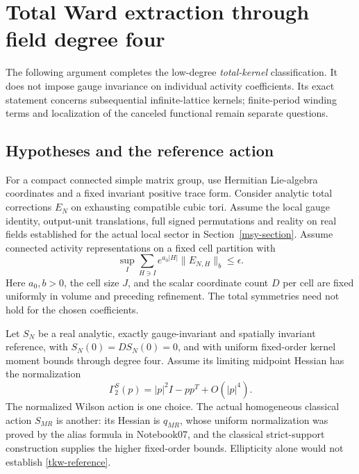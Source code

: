 \section{Total Ward extraction through field degree four}
\label{tkw-section}

The following argument completes the low-degree \emph{total-kernel}
classification. It does not impose gauge invariance on individual
activity coefficients. Its exact statement concerns subsequential
infinite-lattice kernels; finite-period winding terms and localization
of the canceled functional remain separate questions.

\subsection{Hypotheses and the reference action}
\label{tkw-hypotheses}

For a compact connected simple matrix group, use Hermitian Lie-algebra
coordinates and a fixed invariant positive trace form. Consider analytic
total corrections \(E_N\) on exhausting compatible cubic tori. Assume
the local gauge identity, output-unit translations, full signed
permutations and reality on real fields established for the actual
local sector in Section~\ref{msy-section}. Assume connected activity
representations on a fixed cell partition with
\begin{equation}
 \sup_I\sum_{H\ni I}e^{a_0|H|}\|E_{N,H}\|_b\le\epsilon .
 \label{tkw-activity}
\end{equation}
Here \(a_0,b>0\), the cell size \(J\), and the scalar coordinate count
\(D\) per cell are fixed uniformly in volume and preceding refinement.
The total symmetries need not hold for the chosen coefficients.

Let \(S_N\) be a real analytic, exactly gauge-invariant and spatially
invariant reference, with \(S_N(0)=DS_N(0)=0\), and with uniform
fixed-order kernel moment bounds through degree four. Assume its
limiting midpoint Hessian has the normalization
\begin{equation}
 \Gamma_2^S(p)=|p|^2I-pp^T+O(|p|^4).
 \label{tkw-reference}
\end{equation}
The normalized Wilson action is one choice. The actual homogeneous
classical action \(S_{MR}\) is another: its Hessian is \(q_{MR}\),
whose uniform normalization was proved by the alias formula in
Notebook07, and the classical strict-support construction supplies
the higher fixed-order bounds. Ellipticity alone would not establish
\eqref{tkw-reference}.

